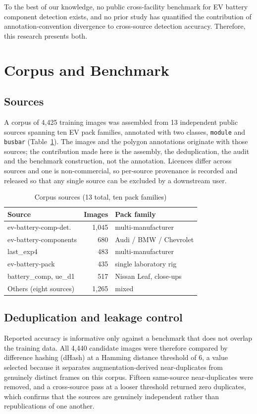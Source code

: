 \documentclass[conference]{IEEEtran}
\begin{document}
To the best of our knowledge, no public cross-facility benchmark for EV battery
component detection exists, and no prior study has quantified the contribution of
annotation-convention divergence to cross-source detection accuracy. Therefore,
this research presents both.

\section{Corpus and Benchmark}
\label{sec:data}

\subsection{Sources}
A corpus of 4,425 training images was assembled from 13 independent public
sources spanning ten EV pack families, annotated with two classes,
\texttt{module} and \texttt{busbar} (Table~\ref{tab:sources}). The images and the
polygon annotations originate with those sources; the contribution made here is
the assembly, the deduplication, the audit and the benchmark construction, not
the annotation. Licences differ across sources and one is non-commercial, so
per-source provenance is recorded and released so that any single source can be
excluded by a downstream user.

\begin{table}[t]
\caption{Corpus sources (13 total, ten pack families)}
\label{tab:sources}
\centering\footnotesize
\setlength{\tabcolsep}{4pt}
\begin{tabular}{lrl}
\toprule
Source & Images & Pack family \\
\midrule
ev-battery-comp-det. & 1,045 & multi-manufacturer \\
ev-battery-components & 680 & Audi / BMW / Chevrolet \\
last\_exp4 & 483 & multi-manufacturer \\
ev-battery-pack & 435 & single laboratory rig \\
battery\_comp, ue\_d1 & 517 & Nissan Leaf, close-ups \\
Others (eight sources) & 1,265 & mixed \\
\bottomrule
\end{tabular}
\end{table}

\subsection{Deduplication and leakage control}
Reported accuracy is informative only against a benchmark that does not overlap
the training data. All 4,440 candidate images were therefore compared by
difference hashing (dHash) at a Hamming distance threshold of 6, a value selected
because it separates augmentation-derived near-duplicates from genuinely distinct
frames on this corpus. Fifteen same-source near-duplicates were removed, and a
cross-source pass at a looser threshold returned zero duplicates, which confirms
that the sources are genuinely independent rather than republications of one
another.
\end{document}
